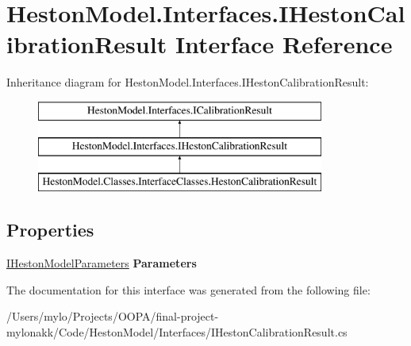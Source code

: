 \hypertarget{interface_heston_model_1_1_interfaces_1_1_i_heston_calibration_result}{}\section{Heston\+Model.\+Interfaces.\+I\+Heston\+Calibration\+Result Interface Reference}
\label{interface_heston_model_1_1_interfaces_1_1_i_heston_calibration_result}
Inheritance diagram for Heston\+Model.\+Interfaces.\+I\+Heston\+Calibration\+Result\+:\begin{figure}[H]
\begin{center}
\leavevmode
\includegraphics[height=3.000000cm]{interface_heston_model_1_1_interfaces_1_1_i_heston_calibration_result}
\end{center}
\end{figure}
\subsection*{Properties}
\begin{DoxyCompactItemize}
\item 
\mbox{\label{interface_heston_model_1_1_interfaces_1_1_i_heston_calibration_result_a92173bd34adfbb1d461d9c26f2cd02bb}} 
\mbox{\hyperlink{interface_heston_model_1_1_interfaces_1_1_i_heston_model_parameters}{I\+Heston\+Model\+Parameters}} {\bfseries Parameters}
\end{DoxyCompactItemize}


The documentation for this interface was generated from the following file\+:\begin{DoxyCompactItemize}
\item 
/\+Users/mylo/\+Projects/\+O\+O\+P\+A/final-\/project-\/mylonakk/\+Code/\+Heston\+Model/\+Interfaces/I\+Heston\+Calibration\+Result.\+cs\end{DoxyCompactItemize}
